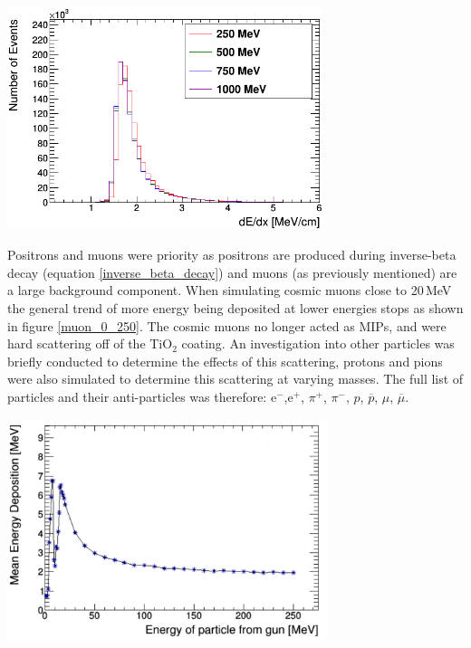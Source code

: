 \documentclass[12pt,a4paper]{article}
\newenvironment{Figure}
  {\par\medskip\noindent\minipage{\linewidth}}
  {\endminipage\par\medskip}
\begin{document}
\begin{Figure}
 \centering
 \includegraphics[height=65mm]{muons_per_mev_cm.png}
 \label{mev_per_cm_muons}
\end{Figure}

Positrons and muons were priority as positrons are produced during inverse-beta decay (equation \ref{inverse_beta_decay}) and muons (as previously mentioned) are a large background component. When simulating cosmic muons close to 20\,MeV the general trend of more energy being deposited at lower energies stops as shown in figure \ref{muon_0_250}. The cosmic muons no longer acted as MIPs, and were hard scattering off of the TiO$_2$ coating. An investigation into other particles was briefly conducted to determine the effects of this scattering, protons and pions were also simulated to determine this scattering at varying masses. The full list of particles and their anti-particles was therefore: e$^-$,e$^+$, $\pi ^+$, $\pi ^-$, $p$,  $\overline{p}$, $\mu $, $\overline{\mu}$.
\\

\begin{Figure}
 \centering
 \includegraphics[height=65mm]{Muon_TiO2_med_eng.png}
 \label{muon_0_250}
\end{Figure}
\end{document}
